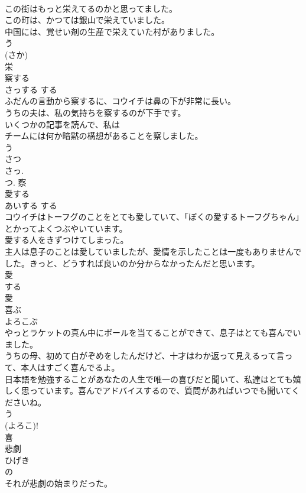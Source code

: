 \documentclass[8pt]{extreport}
\begin{document}
\begin{CJK}{UTF8}{min}
\\	この街はもっと栄えてるのかと思ってました。	
\\	この町は、かつては銀山で栄えていました。	
\\	中国には、覚せい剤の生産で栄えていた村がありました。	
\\	う 
\\	(さか) 
\\	栄	
\\	察する	
\\	さっする	する 
\\	ふだんの言動から察するに、コウイチは鼻の下が非常に長い。	
\\	うちの夫は、私の気持ちを察するのが下手です。	
\\	いくつかの記事を読んで、私は
\\	チームには何か暗黙の構想があることを察しました。	
\\	う 
\\	さつ 
\\	さっ. 
\\	つ.	察	
\\	愛する	
\\	あいする	する 
\\	コウイチはトーフグのことをとても愛していて、「ぼくの愛するトーフグちゃん」とかってよくつぶやいています。	
\\	愛する人をきずつけてしまった。	
\\	主人は息子のことは愛していましたが、愛情を示したことは一度もありませんでした。きっと、どうすれば良いのか分からなかったんだと思います。	
\\	愛 
\\	する 
\\	愛	
\\	喜ぶ	
\\	よろこぶ	
\\	やっとラケットの真ん中にボールを当てることができて、息子はとても喜んでいました。	
\\	うちの母、初めて白がぞめをしたんだけど、十才はわか返って見えるって言って、本人はすごく喜んでるよ。	
\\	日本語を勉強することがあなたの人生で唯一の喜びだと聞いて、私達はとても嬉しく思っています。喜んでアドバイスするので、質問があればいつでも聞いてくださいね。	
\\	う 
\\	(よろこ)!
\\	喜	
\\	悲劇	
\\	ひげき	
\\	の 
\\	それが悲劇の始まりだった。	

\end{CJK}
\end{document}
